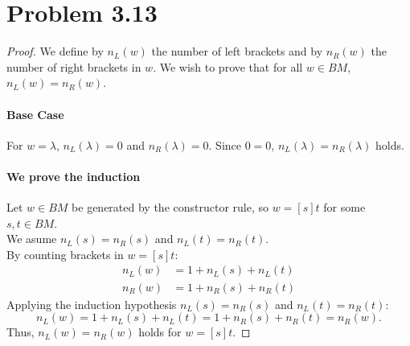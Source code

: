 \documentclass[12pt]{article}
\begin{document}
\section*{Problem 3.13}
\begin{proof}

We define by \(n_L(w)\) the number of left brackets and by \(n_R(w)\) the number of right brackets in \(w\). We wish to prove that for all \(w \in BM\), \(n_L(w) = n_R(w)\).

\paragraph{Base Case}
For \(w = \lambda\), \(n_L(\lambda) = 0\) and \(n_R(\lambda) = 0\).
Since \(0 = 0\), \(n_L(\lambda) = n_R(\lambda)\) holds.

\paragraph{We prove the induction}
Let \(w \in BM\) be generated by the constructor rule, so \(w = [s]t\) for some \(s, t \in BM\).\\
We asume \(n_L(s) = n_R(s)\) and \(n_L(t) = n_R(t)\).\\
By counting brackets in \(w = [s]t\):\\
\begin{align*}
n_L(w) &= 1 + n_L(s) + n_L(t) \\
n_R(w) &= 1 + n_R(s) + n_R(t)
\end{align*}
Applying the induction hypothesis \(n_L(s) = n_R(s)\) and \(n_L(t) = n_R(t)\):
\[
n_L(w) = 1 + n_L(s) + n_L(t) = 1 + n_R(s) + n_R(t) = n_R(w).
\]
Thus, \(n_L(w) = n_R(w)\) holds for \(w = [s]t\).
\end{proof}
\end{document}
